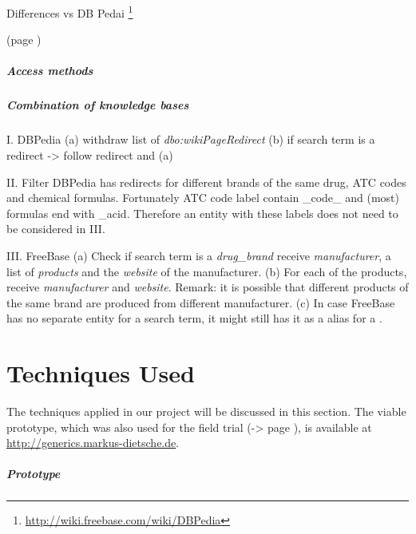 \documentclass[11pt,titlepage,oneside,openany]{book}
\begin{document}
Differences vs DB Pedai
\footnote{\url{http://wiki.freebase.com/wiki/DBPedia}}

(page \pageref{prob:freebase})





\paragraph{Access methods}
\label{sec:access_methods}



\paragraph{Combination of knowledge bases}
\label{sec:dataset_combination}

I. DBPedia
(a) withdraw list of \textit{dbo:wikiPageRedirect}
(b) if search term is a redirect -> follow redirect and (a)

II. Filter 
DBPedia has redirects for different brands of the same drug, ATC codes and chemical formulas. Fortunately ATC code label contain \_code\_ and (most) formulas end with \_acid. Therefore an entity with these labels does not need to be considered in III.

III. FreeBase
(a) Check if search term is a \textit{drug\_brand} receive \textit{manufacturer}, a list of \textit{products} and the \textit{website} of the manufacturer.
(b) For each of the products, receive \textit{manufacturer} and \textit{website}. 
Remark: it is possible that different products of the same brand are produced from different manufacturer.
(c) In case FreeBase has no separate entity for a search term, it might still has it as a alias for a .


\chapter{Techniques Used}
\label{cha:technique}



The techniques applied in our project will be discussed in this section. The viable prototype, which was also used for the field trial (-> page \pageref{sec:field_trial}), is available at \url{http://generics.markus-dietsche.de}.

\paragraph{Prototype}
\label{sec:prototype}
\end{document}
